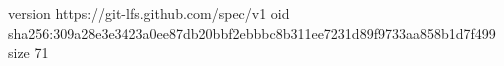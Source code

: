 version https://git-lfs.github.com/spec/v1
oid sha256:309a28e3e3423a0ee87db20bbf2ebbbc8b311ee7231d89f9733aa858b1d7f499
size 71

